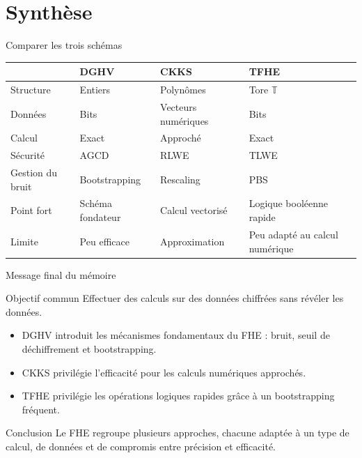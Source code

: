 \documentclass[10pt,aspectratio=169]{beamer}
\begin{document}
\section{Synthèse}

\begin{frame}{Comparer les trois schémas}
  \small
  \begin{tabularx}{\textwidth}{@{}lXXX@{}}
    \toprule
    & \textbf{DGHV} & \textbf{CKKS} & \textbf{TFHE}\\
    \midrule
    Structure & Entiers & Polynômes & Tore $\mathbb{T}$\\
    Données & Bits & Vecteurs numériques & Bits\\
    Calcul & Exact & Approché & Exact\\
    Sécurité & AGCD & RLWE & TLWE\\
    Gestion du bruit & Bootstrapping & Rescaling & PBS\\
    Point fort & Schéma fondateur & Calcul vectorisé & Logique booléenne rapide\\
    Limite & Peu efficace & Approximation & Peu adapté au calcul numérique\\
    \bottomrule
  \end{tabularx}
\end{frame}

\begin{frame}{Message final du mémoire}

  \begin{block}{Objectif commun}
    Effectuer des calculs sur des données chiffrées sans révéler les données.
  \end{block}

  \begin{itemize}
    \item DGHV introduit les mécanismes fondamentaux du FHE :
          bruit, seuil de déchiffrement et bootstrapping.
    \item CKKS privilégie l’efficacité pour les calculs numériques approchés.
    \item TFHE privilégie les opérations logiques rapides grâce à un bootstrapping fréquent.
  \end{itemize}

  \vspace{0.3cm}

  \begin{exampleblock}{Conclusion}
    Le FHE regroupe plusieurs approches, chacune adaptée
    à un type de calcul, de données et de compromis entre précision et efficacité.
  \end{exampleblock}

\end{frame}
\end{document}
